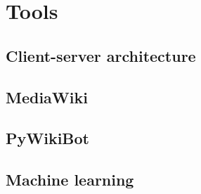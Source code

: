 

\section{Tools}



\subsection{Client-server architecture}


\subsection{MediaWiki}


\subsection{PyWikiBot}


\subsection{Machine learning}
